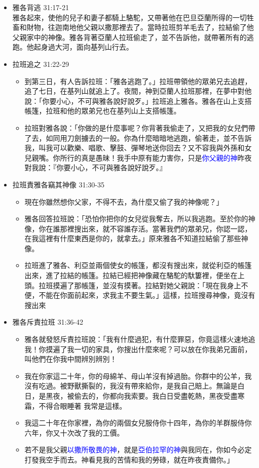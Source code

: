 \begin{itemize} 
\itemsep-.35em 
\item 雅各背逃 31:17-21\\
雅各起來，使他的兒子和妻子都騎上駱駝，又帶著他在巴旦亞蘭所得的一切牲畜和財物，往迦南地他父親以撒那裡去了。當時拉班剪羊毛去了，拉結偷了他父親家中的神像。雅各背著亞蘭人拉班偷走了，並不告訴他，就帶著所有的逃跑。他起身過大河，面向基列山行去。
\item 拉班追之 31:22-29
\begin{itemize} 
\itemsep-.35em 
\item 到第三日，有人告訴拉班：「雅各逃跑了。」拉班帶領他的眾弟兄去追趕，追了七日，在基列山就追上了。夜間，神到亞蘭人拉班那裡，在夢中對他說：「你要小心，不可與雅各說好說歹。」拉班追上雅各。雅各在山上支搭帳篷，拉班和他的眾弟兄也在基列山上支搭帳篷。
\item 拉班對雅各說：「你做的是什麼事呢？你背著我偷走了，又把我的女兒們帶了去，如同用刀劍擄去的一般。你為什麼暗暗地逃跑，偷著走，並不告訴我，叫我可以歡樂、唱歌、擊鼓、彈琴地送你回去？又不容我與外孫和女兒親嘴。你所行的真是愚昧！我手中原有能力害你，只是\textcolor{blue}{你父親的神}昨夜對我說：『你要小心，不可與雅各說好說歹。』
\end{itemize}
\item 拉班責雅各竊其神像 31:30-35
\begin{itemize} 
\itemsep-.35em 
\item 現在你雖然想你父家，不得不去，為什麼又偷了我的神像呢？」 
\item 雅各回答拉班說：「恐怕你把你的女兒從我奪去，所以我逃跑。至於你的神像，你在誰那裡搜出來，就不容誰存活。當著我們的眾弟兄，你認一認，在我這裡有什麼東西是你的，就拿去。」原來雅各不知道拉結偷了那些神像。
\item 拉班進了雅各、利亞並兩個使女的帳篷，都沒有搜出來，就從利亞的帳篷出來，進了拉結的帳篷。拉結已經把神像藏在駱駝的馱簍裡，便坐在上頭。拉班摸遍了那帳篷，並沒有摸著。拉結對她父親說：「現在我身上不便，不能在你面前起來，求我主不要生氣。」這樣，拉班搜尋神像，竟沒有搜出來
\end{itemize}
\item 雅各斥責拉班 31:36-42 
\begin{itemize} 
\itemsep-.35em 
\item 雅各就發怒斥責拉班說：「我有什麼過犯，有什麼罪惡，你竟這樣火速地追我！你摸遍了我一切的家具，你搜出什麼來呢？可以放在你我弟兄面前，叫他們在你我中間辨別辨別！
\item 我在你家這二十年，你的母綿羊、母山羊沒有掉過胎。你群中的公羊，我沒有吃過。被野獸撕裂的，我沒有帶來給你，是我自己賠上。無論是白日，是黑夜，被偷去的，你都向我索要。我白日受盡乾熱，黑夜受盡寒霜，不得合眼睡著
我常是這樣。
\item 我這二十年在你家裡，為你的兩個女兒服侍你十四年，為你的羊群服侍你六年，你又十次改了我的工價。
\item 若不是我父親\textcolor{blue}{以撒所敬畏的神}，就是\textcolor{blue}{亞伯拉罕的神}與我同在，你如今必定打發我空手而去。神看見我的苦情和我的勞碌，就在昨夜責備你。」
\end{itemize}
\end{itemize}

